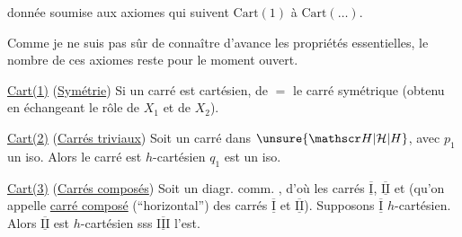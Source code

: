 donnée   soumise aux axiomes qui suivent $\mathrm{Cart}(1)$ à $\mathrm{Cart}(\ldots)$.

Comme je ne suis pas sûr de connaître d'avance  les propriétés essentielles, le nombre de ces axiomes reste pour le moment ouvert.

\uline{Cart(1)} (\uline{Symétrie}) Si un carré
est cartésien, de $=$ le carré symétrique (obtenu en échangeant le rôle de $X_1$ et de $X_2$).

\uline{Cart(2)} (\uline{Carrés triviaux}) Soit
un carré dans $\unsure{\mathscr H|\mathcal H|H}$, avec $p_1$ un iso. Alors le carré est $h$-cartésien  $q_1$ est un iso.

\uline{Cart(3)} (\uline{Carrés composés}) Soit un diagr. comm.
, d'où les carrés $\underline{\overline{\mathrm I}}$, $\underline{\overline{\mathrm{II}}}$ et
(qu'on appelle \uline{carré composé} (``horizontal'') des carrés $\underline{\overline{\mathrm I}}$ et $\underline{\overline{\mathrm{II}}}$). Supposons $\underline{\overline{\mathrm I}}$ $h$-cartésien. Alors $\underline{\overline{\mathrm{II}}}$ est $h$-cartésien sss $\underline{\overline{\mathrm{III}}}$ l'est.

